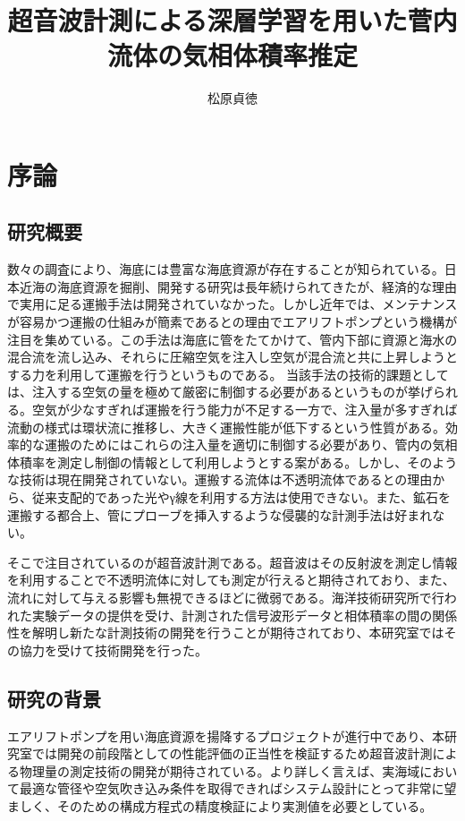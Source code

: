 \documentclass[uplatex]{suribt}
\title{超音波計測による深層学習を用いた菅内流体の気相体積率推定}
\author{松原貞徳}
\makeatletter
\renewcommand{\subsection}{%
    \@startsection{subsection}{1}{\z@}%
    {0.4\Cvs}{0.1\Cvs}%
    {\normalfont\normalsize\headfont\raggedright}}
\makeatother
\begin{document}
\setcounter{tocdepth}{2}%
\maketitle
\tableofcontents
\chapter{序論}
\section{研究概要}
数々の調査により、海底には豊富な海底資源が存在することが知られている。日本近海の海底資源を掘削、開発する研究は長年続けられてきたが、経済的な理由で実用に足る運搬手法は開発されていなかった。しかし近年では、メンテナンスが容易かつ運搬の仕組みが簡素であるとの理由でエアリフトポンプという機構が注目を集めている。この手法は海底に管をたてかけて、管内下部に資源と海水の混合流を流し込み、それらに圧縮空気を注入し空気が混合流と共に上昇しようとする力を利用して運搬を行うというものである。
当該手法の技術的課題としては、注入する空気の量を極めて厳密に制御する必要があるというものが挙げられる。空気が少なすぎれば運搬を行う能力が不足する一方で、注入量が多すぎれば流動の様式は環状流に推移し、大きく運搬性能が低下するという性質がある。効率的な運搬のためにはこれらの注入量を適切に制御する必要があり、管内の気相体積率を測定し制御の情報として利用しようとする案がある。しかし、そのような技術は現在開発されていない。運搬する流体は不透明流体であるとの理由から、従来支配的であった光やγ線を利用する方法は使用できない。また、鉱石を運搬する都合上、管にプローブを挿入するような侵襲的な計測手法は好まれない。\par
そこで注目されているのが超音波計測である。超音波はその反射波を測定し情報を利用することで不透明流体に対しても測定が行えると期待されており、また、流れに対して与える影響も無視できるほどに微弱である。海洋技術研究所で行われた実験データの提供を受け、計測された信号波形データと相体積率の間の関係性を解明し新たな計測技術の開発を行うことが期待されており、本研究室ではその協力を受けて技術開発を行った。
\section{研究の背景}
エアリフトポンプを用い海底資源を揚降するプロジェクトが進行中であり、本研究室では開発の前段階としての性能評価の正当性を検証するため超音波計測による物理量の測定技術の開発が期待されている。より詳しく言えば、実海域において最適な管径や空気吹き込み条件を取得できればシステム設計にとって非常に望ましく、そのための構成方程式の精度検証により実測値を必要としている。
\end{document}
